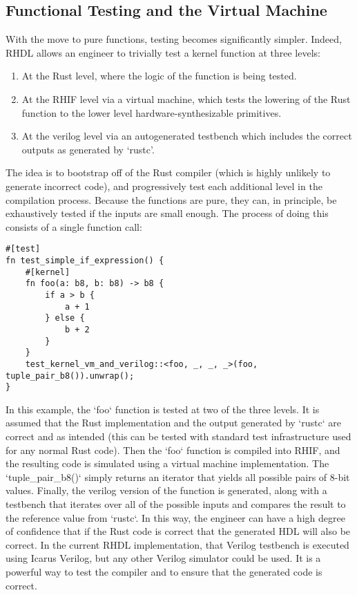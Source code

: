 \documentclass[conference]{IEEEtran}
\begin{document}
\subsection{Functional Testing and the Virtual Machine}
With the move to pure functions, testing becomes significantly simpler.  Indeed, RHDL allows an engineer to 
trivially test a kernel function at three levels:

\begin{enumerate}
  \item At the Rust level, where the logic of the function is being tested.
  \item At the RHIF level via a virtual machine, which tests the lowering of the Rust function to the lower 
  level hardware-synthesizable primitives.
  \item At the verilog level via an autogenerated testbench which includes the correct outputs as generated 
  by `rustc'.
\end{enumerate}

The idea is to bootstrap off of the Rust compiler (which is highly unlikely to generate incorrect code), and progressively
test each additional level in the compilation process.  Because the functions are pure, they can, in principle, be
exhaustively tested if the inputs are small enough.  The process of doing this consists of a single function call:

\begin{verbatim}
#[test]
fn test_simple_if_expression() {
    #[kernel]
    fn foo(a: b8, b: b8) -> b8 {
        if a > b {
            a + 1
        } else {
            b + 2
        }
    }
    test_kernel_vm_and_verilog::<foo, _, _, _>(foo, tuple_pair_b8()).unwrap();
}  
\end{verbatim}

In this example, the `foo` function is tested at two of the three levels.  It is assumed that the 
Rust implementation and the output generated by `rustc` are correct and as intended (this can be tested
with standard test infrastructure used for any normal Rust code).  Then the `foo` function is compiled into RHIF, and
the resulting code is simulated using a virtual machine implementation.  The `tuple_pair_b8()` simply returns an
iterator that yields all possible pairs of 8-bit values.  Finally, the verilog version of the function is 
generated, along with a testbench that iterates over all of the possible inputs and compares the result to 
the reference value from `rustc`.  In this way, the engineer can have a high degree of confidence that if the Rust 
code is correct that the generated HDL will also be correct.  In the current RHDL implementation, that Verilog testbench
is executed using Icarus Verilog, but any other Verilog simulator could be used.  It is a powerful way to test 
the compiler and to ensure that the generated code is correct.
\end{document}
